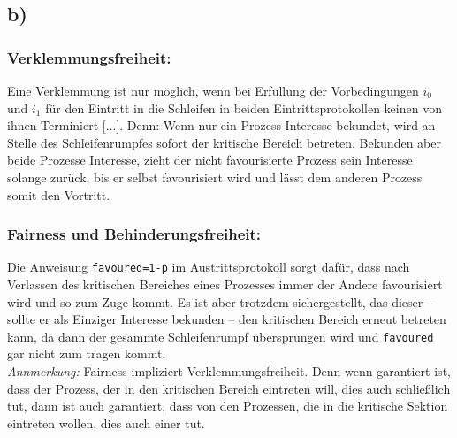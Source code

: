 \documentclass[11pt,a4paper,DIV=10,]{scrartcl}
\begin{document}
\subsection*{b)}
\subsubsection*{Verklemmungsfreiheit:}
\glqq Eine Verklemmung ist nur möglich, wenn bei Erfüllung der Vorbedingungen $i_0$ und $i_1$ für den Eintritt in die Schleifen in beiden Eintrittsprotokollen keinen von ihnen Terminiert [...]\grqq \cite[vgl.][S. 44]{Maurer.2012}. Denn: Wenn nur ein Prozess Interesse bekundet, wird an Stelle des  Schleifenrumpfes sofort der kritische Bereich betreten. Bekunden aber beide Prozesse Interesse, zieht der nicht favourisierte Prozess sein Interesse solange zurück, bis er selbst favourisiert wird und lässt dem anderen Prozess somit den Vortritt.

\subsubsection*{Fairness und Behinderungsfreiheit:}
Die Anweisung \texttt{favoured=1-p} im Austrittsprotokoll sorgt dafür, dass nach Verlassen des kritischen Bereiches eines Prozesses immer der Andere favourisiert wird und so zum Zuge kommt. Es ist aber trotzdem sichergestellt, das dieser -- sollte er als Einziger Interesse bekunden --  den kritischen Bereich erneut betreten kann, da dann der gesammte Schleifenrumpf übersprungen wird und \texttt{favoured} gar nicht zum tragen kommt. \\
\textit{Annmerkung:} Fairness impliziert Verklemmungsfreiheit. Denn wenn garantiert ist, dass der Prozess, der in den kritischen Bereich eintreten will, dies auch schließlich tut, dann ist auch garantiert, dass von den Prozessen, die in die kritische Sektion eintreten wollen, dies auch einer tut.
\end{document}
